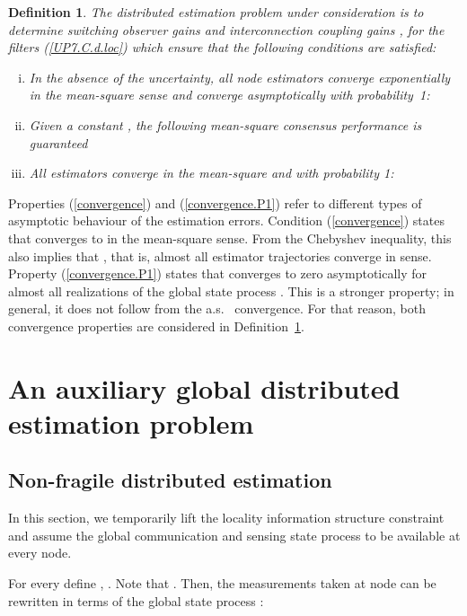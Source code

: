 \documentclass[a4paper,twocolumn]{autart}
\newtheorem{definition}{Definition}
\begin{document}
\begin{definition}\label{Def1}
The distributed estimation problem under consideration is
to determine switching observer gains
 and interconnection coupling gains
, for the filters 
(\ref{UP7.C.d.loc}) which ensure that the following conditions are
satisfied:
  \begin{enumerate}[(i)]
  \item
In the absence of the uncertainty, all node estimators converge
exponentially in the mean-square sense and converge asymptotically with probability~1:


\item Given a constant , 
the following mean-square  consensus performance is guaranteed


\item
 All estimators converge in the mean-square and with probability 1:

  \end{enumerate}
\end{definition}
Properties (\ref{convergence}) and (\ref{convergence.P1}) refer to
different types of asymptotic behaviour of the estimation errors. Condition
(\ref{convergence}) states that  converges to 
in the mean-square  sense. From the Chebyshev inequality, this also implies that
,
that is, almost all estimator trajectories converge in  sense.
Property (\ref{convergence.P1}) states that  converges to zero
asymptotically for almost
all realizations of the global state process . This is a stronger
property; in general, it does not follow from the a.s.~
convergence. For that reason, both convergence properties are
considered in Definition~\ref{Def1}.    

\section{An auxiliary global distributed estimation
  problem}\label{sec:design-global} 

\subsection{Non-fragile distributed estimation}  

In this section, we temporarily lift the locality information structure
constraint and assume the
global communication and sensing state process  to be available at
every node. 

For every  define 
, . Note that .
Then, the measurements taken at node  can be rewritten in terms of
the global state process :  
\end{document}
